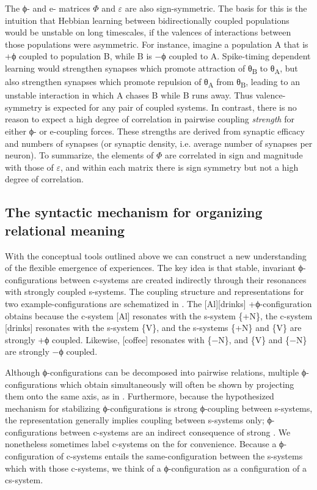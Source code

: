   The ϕ- and e- matrices $\Phi$ and $\varepsilon $ are also sign-symmetric. The basis for this is the intuition that Hebbian learning between bidirectionally coupled populations would be unstable on long timescales, if the valences of interactions between those populations were asymmetric. For instance, imagine a population A that is +ϕ coupled to population B, while B is −ϕ coupled to A. Spike-timing dependent learning would strengthen synapses which promote attraction of θ\textsubscript{B} to θ\textsubscript{A}, but also strengthen synapses which promote repulsion of θ\textsubscript{A} from θ\textsubscript{B}, leading to an unstable interaction in which A chases B while B runs away. Thus valence-symmetry is expected for any pair of coupled systems. In contrast, there is no reason to expect a high degree of correlation in pairwise coupling \textit{strength} for either ϕ- or e-coupling forces. These strengths are derived from synaptic efficacy and numbers of synapses (or synaptic density, i.e. average number of synapses per neuron). To summarize, the elements of $\Phi$ are correlated in sign and magnitude with those of $\varepsilon $, and within each matrix there is sign symmetry but not a high degree of correlation.

\subsection{The syntactic mechanism for organizing relational meaning}

With the conceptual tools outlined above we can construct a new understanding of the flexible emergence of  experiences. The key idea is that stable, invariant ϕ-configurations between c-systems are created indirectly through their resonances with strongly coupled s-systems. The coupling structure and  representations for two example-configurations are schematized in {}. The [Al][drinks] +ϕ-configuration obtains because the c-system [Al] resonates with the s-system \{+N\}, the c-system [drinks] resonates with the s-system \{V\}, and the s-systems \{+N\} and \{V\} are strongly +ϕ coupled. Likewise, [coffee] resonates with \{−N\}, and \{V\} and \{−N\} are strongly −ϕ coupled.

  Although ϕ-configurations can be decomposed into pairwise relations, multiple ϕ-configurations which obtain simultaneously will often be shown by projecting them onto the same  axis, as in {}. Furthermore, because the hypothesized mechanism for stabilizing ϕ-configurations is strong ϕ-coupling between s-systems, the  representation generally implies coupling between s-systems only; ϕ-configurations between c-systems are an indirect consequence of strong . We nonetheless sometimes label c-systems on the  for convenience. Because a ϕ-configuration of c-systems entails the same-configuration between the s-systems which  with those c-systems, we think of a ϕ-configuration as a configuration of a cs-system. 

